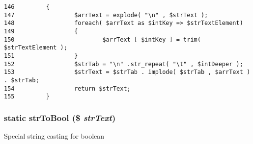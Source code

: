 \begin{Code}\begin{verbatim}146         {
147                 $arrText = explode( "\n" , $strText );
148                 foreach( $arrText as $intKey => $strTextElement)
149                 {
150                         $arrText [ $intKey ] = trim( $strTextElement );
151                 }
152                 $strTab = "\n" .str_repeat( "\t" , $intDeeper );
153                 $strText = $strTab . implode( $strTab , $arrText ) . $strTab;
154                 return $strText;
155         }
\end{verbatim}
\end{Code}


\hypertarget{class_coruja_string_manipulation_24ac3f5ac008091fe6fd23a4cf3523c3}{
\subsubsection[{strToBool}]{\setlength{\rightskip}{0pt plus 5cm}static strToBool (\$ {\em strText})}}
\label{class_coruja_string_manipulation_24ac3f5ac008091fe6fd23a4cf3523c3}


Special string casting for boolean

